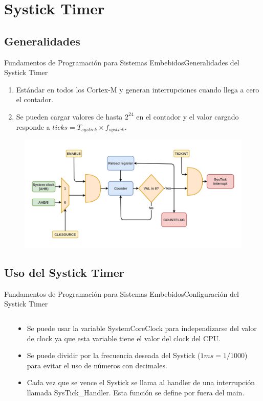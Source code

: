 \documentclass[aspectratio=169, xcolor=dvipsnames]{beamer}
\begin{document}
\section{Systick Timer}
\subsection{Generalidades}
\begin{frame}{Fundamentos de Programación para Sistemas Embebidos}{Generalidades del Systick Timer}
\begin{enumerate}
    \item Estándar en todos los Cortex-M y generan interrupciones cuando llega a cero el contador.
    \item Se pueden cargar valores de hasta $2^{24}$ en el contador y el valor cargado responde a $ticks = T_{systick} \times f_{systick}$.
\end{enumerate}
\begin{figure}
\centering
\includegraphics[width=0.6\linewidth]{resources/images/systick.png}
\end{figure}
\end{frame}

\subsection{Uso del Systick Timer}
\begin{frame}{Fundamentos de Programación para Sistemas Embebidos}{Configuración del Systick Timer}
\begin{columns}
\begin{column}{0.4\textwidth}

\end{column}
\begin{column}{0.6\textwidth}
\begin{itemize}
    \item Se puede usar la variable \textcolor{myblue}{SystemCoreClock} para independizarse del valor de clock ya que esta variable tiene el valor del clock del CPU.
    \item Se puede dividir por la frecuencia deseada del Systick ($1ms = 1 / 1000$) para evitar el uso de números con decimales.
    \item Cada vez que se vence el Systick se llama al handler de una interrupción llamada \textcolor{myblue}{SysTick\_Handler}. Esta función se define por fuera del main.
\end{itemize}
\end{column}
\end{columns}
\end{frame}
\end{document}
